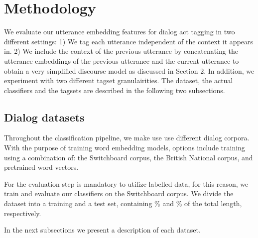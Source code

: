 \section{Methodology}\label{sec:method}
%

We evaluate our utterance embedding features for dialog act tagging in two different settings:
1) We tag each utterance independent of the context it appears in.
2) We include the context of the previous utterance by concatenating the utterance embeddings of the previous utterance and the current utterance to obtain a very simplified discourse model as discussed in Section 2.
In addition, we experiment with two different tagset granulairities.
The dataset, the actual classifiers and the tagsets are described in the following two subsections.

\subsection{Dialog datasets}
Throughout the classification pipeline, we make use use different dialog corpora. With the purpose of training word embedding models, options include training using a combination of: the Switchboard corpus, the British National corpus, and pretrained word vectors.

For the evaluation step is mandatory to utilize labelled data, for this reason, we train and evaluate our classifiers on the Switchboard corpus. We divide the dataset into a training and a test set, containing $\%$ and $\%$ of the total length, respectively. 

In the next subsections we present a description of each dataset.

